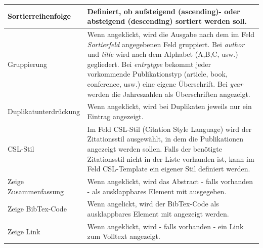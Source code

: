 \begin{longtabu}{|X|p{7cm}|}
Sortierreihenfolge &	Definiert, ob aufsteigend (ascending)- oder absteigend (descending) sortiert werden soll.\\ \hline 
Gruppierung &	Wenn angeklickt, wird die Ausgabe nach dem im Feld \textit{Sortierfeld} angegebenen Feld gruppiert. Bei \textit{author} und \textit{title} wird nach dem Alphabet (A,B,C, usw.) gegliedert. Bei \textit{entrytype} bekommt jeder vorkommende Publikationstyp (article, book, conference, usw.) eine eigene Überschrift. Bei \textit{year} werden die Jahreszahlen als Überschriften angezeigt.\\ \hline
Duplikat\-unterdrückung &	Wenn angeklickt, wird bei Duplikaten je\-weils nur ein Eintrag angezeigt.\\ \hline
CSL-Stil &	Im Feld CSL-Stil (Citation Style Language) wird der Zitationsstil ausgewählt, in dem die Publikationen angezeigt werden sollen. Falls der benötigte Zitationsstil nicht in der Liste vorhanden ist, kann im Feld CSL-Template ein eigener Stil definiert werden.\\ \hline
Zeige Zusammenfassung& 	Wenn angeklickt, wird das Abstract - falls vorhanden - als ausklappbares Element mit ausgegeben.\\ \hline
Zeige BibTex-Code &	Wenn angelickt, wird der BibTex-Code als ausklappbares Element mit angezeigt werden.\\ \hline
Zeige Link & Wenn angeklickt, wird - falls vorhanden - ein Link zum Volltext angezeigt.\\ \hline
\end{longtabu}
